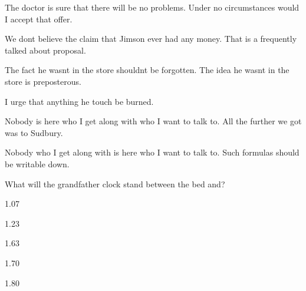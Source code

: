 \begin{multicols}{3}
\begin{styleStandard}
The doctor is sure that there will be no problems. Under no circumstances would I accept that offer.
\end{styleStandard}


\begin{styleStandard}
We don{\textquotesingle}t believe the claim that Jimson ever had any money. That is a frequently talked about proposal.
\end{styleStandard}


\begin{styleStandard}
The fact he wasn{\textquotesingle}t in the store shouldn{\textquotesingle}t be forgotten. The idea he wasn{\textquotesingle}t in the store is preposterous.
\end{styleStandard}


\begin{styleStandard}
I urge that anything he touch be burned.
\end{styleStandard}


\begin{styleStandard}
Nobody is here who I get along with who I want to talk to. All the further we got was to Sudbury.
\end{styleStandard}


\begin{styleStandard}
Nobody who I get along with is here who I want to talk to. Such formulas should be writable down.
\end{styleStandard}


\begin{styleStandard}
What will the grandfather clock stand between the bed and?
\end{styleStandard}


\begin{styleStandard}
1.07
\end{styleStandard}


\begin{styleStandard}
1.23
\end{styleStandard}


\begin{styleStandard}
1.63
\end{styleStandard}


\begin{styleStandard}
1.70
\end{styleStandard}


\begin{styleStandard}
1.80
\end{styleStandard}



\end{multicols}
